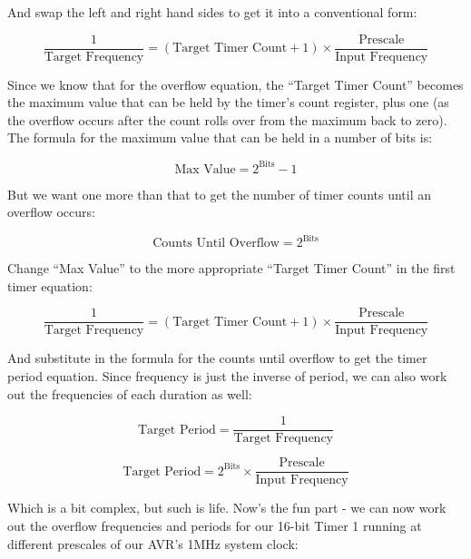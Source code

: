 \documentclass[a4paper,oneside,notitlepage]{book}
\begin{document}
And swap the left and right hand sides to get it into a conventional form:

\begin{displaymath}
\frac{1}{\text{Target Frequency}} = (\text{Target Timer Count} + 1) \times \frac{\text{Prescale}}{\text{Input Frequency}}
\end{displaymath}

Since we know that for the overflow equation, the ``Target Timer Count'' becomes the maximum value that can be held by the timer's count register, plus one (as the overflow occurs after the count rolls over from the maximum back to zero). The formula for the maximum value that can be held in a number of bits is:

\begin{displaymath}
\text{Max Value} = 2^\text{Bits} - 1
\end{displaymath}

But we want one more than that to get the number of timer counts until an overflow occurs:

\begin{displaymath}
\text{Counts Until Overflow} = 2^\text{Bits}
\end{displaymath}

Change ``Max Value'' to the more appropriate ``Target Timer Count'' in the first timer equation:

\begin{displaymath}
\frac{1}{\text{Target Frequency}} = (\text{Target Timer Count} + 1) \times \frac{\text{Prescale}}{\text{Input Frequency}}
\end{displaymath}

And substitute in the formula for the counts until overflow to get the timer period equation. Since frequency is just the inverse of period, we can also work out the frequencies of each duration as well:

\begin{displaymath}
\text{Target Period} = \frac{1}{\text{Target Frequency}}
\end{displaymath}

\begin{displaymath}
\text{Target Period} = 2^\text{Bits} \times \frac{\text{Prescale}}{\text{Input Frequency}}
\end{displaymath}

Which is a bit complex, but such is life. Now's the fun part - we can now work out the overflow frequencies and periods for our 16-bit Timer 1 running at different prescales of our AVR's 1MHz system clock:
\end{document}
